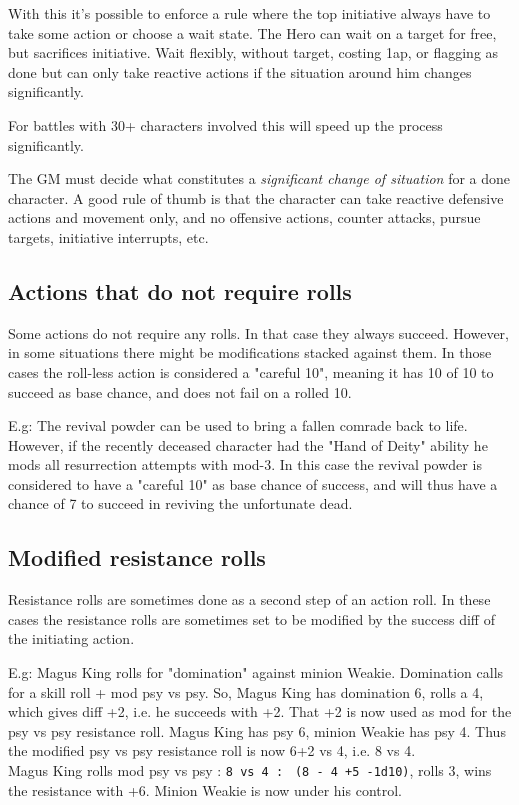 With this it's possible to enforce a rule where the top initiative always have to take some action or choose a wait state. The Hero can wait on a target for free, but sacrifices initiative. Wait flexibly, without target, costing 1ap, or flagging as done but can only take reactive actions if the situation around him changes significantly.

For battles with 30+ characters involved this will speed up the process significantly.

The GM must decide what constitutes a \emph{significant change of situation} for a done character. A good rule of thumb is that the character can take reactive defensive actions and movement only, and no offensive actions, counter attacks, pursue targets, initiative interrupts, etc.


\subsection*{Actions that do not require rolls}
Some actions do not require any rolls. In that case they always succeed. However, in some situations there might be modifications stacked against them. In those cases the roll-less action is considered a "careful 10", meaning it has 10 of 10 to succeed as base chance, and does not fail on a rolled 10.

E.g: The revival powder can be used to bring a fallen comrade back to life. However, if the recently deceased character had the "Hand of Deity" ability he mods all resurrection attempts with mod-3. In this case the revival powder is considered to have a "careful 10" as base chance of success, and will thus have a chance of 7 to succeed in reviving the unfortunate dead.


\subsection*{Modified resistance rolls}
Resistance rolls are sometimes done as a second step of an action roll. In these cases the resistance rolls are sometimes set to be modified by the success diff of the initiating action.

E.g: Magus King rolls for "domination" against minion Weakie. Domination calls for a skill roll + mod psy vs psy. So, Magus King has domination 6, rolls a 4, which gives diff +2, i.e. he succeeds with +2. That +2 is now used as mod for the psy vs psy resistance roll. Magus King has psy 6, minion Weakie has psy 4. Thus the modified psy vs psy resistance roll is now 6+2 vs 4, i.e. 8 vs 4.\\
Magus King rolls mod psy vs psy : \verb|8 vs 4 : | \verb|(8 - 4 +5 -1d10)|, rolls 3, wins the resistance with +6. Minion Weakie is now under his control.

